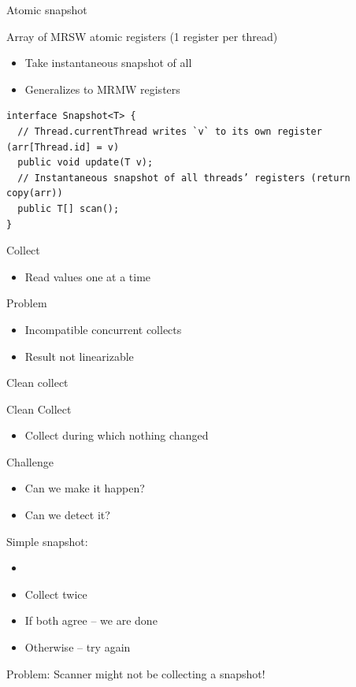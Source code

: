 \begin{frame}[fragile]{Atomic snapshot}

Array of MRSW atomic registers (1 register per thread)
\begin{itemize}
  \item Take instantaneous snapshot of all
  \item Generalizes to MRMW registers
\end{itemize}

\pause

\begin{verbatim}
interface Snapshot<T> {
  // Thread.currentThread writes `v` to its own register (arr[Thread.id] = v)
  public void update(T v);
  // Instantaneous snapshot of all threads’ registers (return copy(arr))
  public T[] scan();
}
\end{verbatim}

\pause

Collect
\begin{itemize}
  \item Read values one at a time
\end{itemize}

Problem
\begin{itemize}
  \item Incompatible concurrent collects
  \item Result not linearizable
\end{itemize}

\end{frame}


\begin{frame}{Clean collect}

Clean Collect
\begin{itemize}
  \item Collect during which nothing changed
\end{itemize}

\pause

Challenge
\begin{itemize}
  \item Can we make it happen?
  \item Can we detect it?
\end{itemize}

\pause
Simple snapshot:
\begin{itemize}
  \item {} 
  \item Collect twice
  \item If both agree -- we are done
  \item Otherwise -- try again
\end{itemize}

\pause
\pause
Problem: Scanner might not be collecting a snapshot!

\end{frame}


